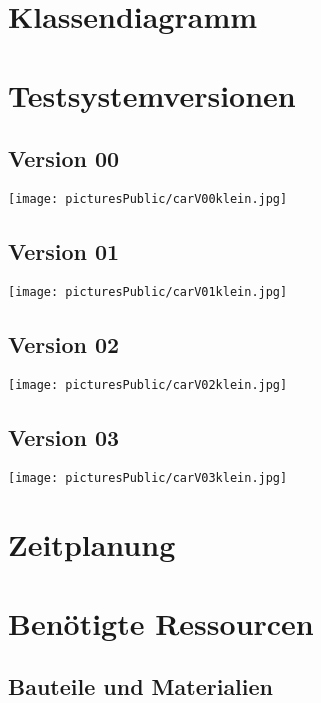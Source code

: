 \documentclass[11pt]{report}
\begin{document}
\chapter{Klassendiagramm}



\chapter{Testsystemversionen}

\section{Version 00}
\texttt{[image: picturesPublic/carV00klein.jpg]}

\section{Version 01}
\texttt{[image: picturesPublic/carV01klein.jpg]}

\section{Version 02}
\texttt{[image: picturesPublic/carV02klein.jpg]}

\section{Version 03}
\texttt{[image: picturesPublic/carV03klein.jpg]}


\chapter{Zeitplanung}
\newpage



\chapter{Benötigte Ressourcen}

\section{Bauteile und Materialien}
\end{document}
